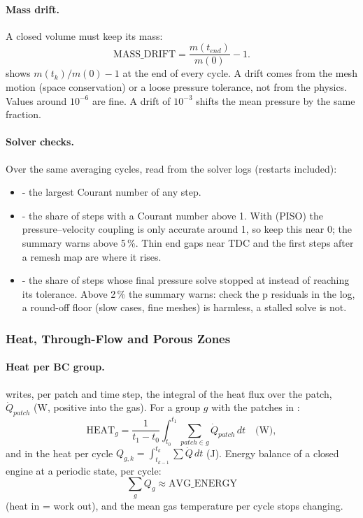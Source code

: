 \paragraph{Mass drift.}
A closed volume must keep its mass:
\begin{equation}
\mathrm{MASS\_DRIFT} = \frac{m(t_{end})}{m(0)} - 1 .
\end{equation}
 shows $m(t_k)/m(0) - 1$ at the end of every cycle. A drift comes from the mesh motion (space conservation) or a loose pressure tolerance, not from the physics. Values around $10^{-6}$ are fine. A drift of $10^{-3}$ shifts the mean pressure by the same fraction.

\paragraph{Solver checks.}
Over the same averaging cycles, read from the solver logs (restarts included):
\begin{itemize}
    \item {} - the largest Courant number of any step.
    \item {} - the share of steps with a Courant number above 1. With  (PISO) the pressure--velocity coupling is only accurate around 1, so keep this near 0; the summary warns above 5\,\%. Thin end gaps near TDC and the first steps after a remesh map are where it rises.
    \item {} - the share of steps whose final pressure solve stopped at  instead of reaching its tolerance. Above 2\,\% the summary warns: check the p residuals in the log, a round-off floor (slow cases, fine meshes) is harmless, a stalled solve is not.
\end{itemize}

\subsubsection{Heat, Through-Flow and Porous Zones}
\paragraph{Heat per BC group.}
 writes, per patch and time step, the integral of the heat flux over the patch, $\dot{Q}_{patch}$ (W, positive into the gas). For a group $g$ with the patches in :
\begin{equation}
\mathrm{HEAT}_g = \frac{1}{t_1 - t_0}\int_{t_0}^{t_1}\sum_{patch \in g} \dot{Q}_{patch}\, dt \quad \textrm{(W)},
\end{equation}
and in  the heat per cycle $Q_{g,k} = \int_{t_{k-1}}^{t_k} \sum \dot{Q}\,dt$ (J). Energy balance of a closed engine at a periodic state, per cycle:
\begin{equation}
\sum_g Q_g \approx \mathrm{AVG\_ENERGY}
\end{equation}
(heat in = work out), and the mean gas temperature per cycle stops changing.

